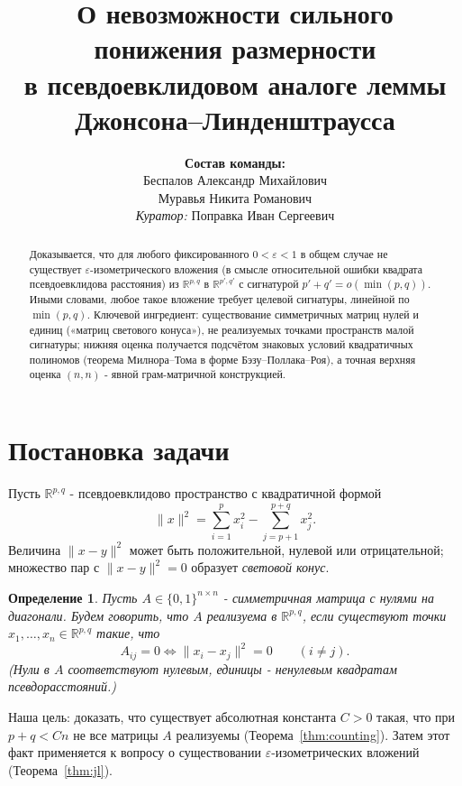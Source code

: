 \documentclass[12pt]{article}
\newtheorem{definition}{Определение}
\newcommand{\R}{\mathbb{R}}
\begin{document}
\title{О невозможности сильного понижения размерности\\ в псевдоевклидовом аналоге леммы Джонсона--Линденштраусса}
\author{%
  \textbf{Состав команды:}\\[0.5em]
  Беспалов Александр Михайлович\\
  Муравья Никита Романович\\[1.5em]
  \textit{Куратор:} Поправка Иван Сергеевич
}
\date{}
\maketitle

\begin{abstract}
Доказывается, что для любого фиксированного \(0<\varepsilon<1\) в общем случае не существует \(\varepsilon\)-изометрического вложения (в смысле относительной ошибки квадрата псевдоевклидова расстояния) из \(\R^{p,q}\) в \(\R^{p',q'}\) с сигнатурой \(p'+q' = o(\min(p,q))\). Иными словами, любое такое вложение требует целевой сигнатуры, линейной по \(\min(p,q)\). Ключевой ингредиент: существование симметричных матриц нулей и единиц («матриц светового конуса»), не реализуемых точками пространств малой сигнатуры; нижняя оценка получается подсчётом знаковых условий квадратичных полиномов (теорема Милнора--Тома в форме Бэзу--Поллака--Роя), а точная верхняя оценка \((n,n)\) - явной грам-матричной конструкцией.
\end{abstract}

\section{Постановка задачи}

Пусть \(\R^{p,q}\) - псевдоевклидово пространство с квадратичной формой
\[
\|x\|^2 = \sum_{i=1}^p x_i^2 - \sum_{j=p+1}^{p+q} x_j^2 .
\]
Величина \(\|x-y\|^2\) может быть положительной, нулевой или отрицательной; множество пар с \(\|x-y\|^2=0\) образует \emph{световой конус}.

\begin{definition}
Пусть \(A \in \{0,1\}^{n\times n}\) - симметричная матрица с нулями на диагонали. Будем говорить, что \(A\) \emph{реализуема} в \(\R^{p,q}\), если существуют точки \(x_1,\dots,x_n \in \R^{p,q}\) такие, что
\[
A_{ij}=0 \iff \|x_i - x_j\|^2 = 0 \qquad (i\ne j).
\]
(Нули в \(A\) соответствуют нулевым, единицы - ненулевым квадратам псевдорасстояний.)
\end{definition}

Наша цель: доказать, что существует абсолютная константа \(C>0\) такая, что при \(p+q < C n\) не все матрицы \(A\) реализуемы (Теорема~\ref{thm:counting}). Затем этот факт применяется к вопросу о существовании \(\varepsilon\)-изометрических вложений (Теорема~\ref{thm:jl}).
\end{document}
